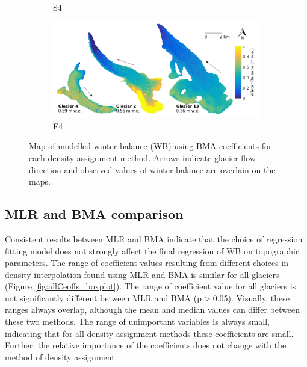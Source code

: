 \documentclass{sfuthesis}
\newcommand{\swedots}{Arrows indicate glacier flow direction and observed values of winter balance are overlain on the maps. }
\begin{document}
\begin{figure}[H]
\begin{subfigure}[b]{0.475\textwidth}
            \caption[]%
            {{\small S4}}    
        \end{subfigure}
        \quad
        \begin{subfigure}[b]{0.475\textwidth}   
            \centering 
            \includegraphics[width=\textwidth]{BMSmap_Modelled_Observed8.png}
            \caption[]%
            {{\small F4}}    
        \end{subfigure}
              
        \caption[Map of modelled winter balance (WB) using BMA coefficients for each density assignment method]
        {Map of modelled winter balance (WB) using BMA coefficients for each density assignment method. \swedots} 
        \label{fig:allBMSmodelled}
    \end{figure}




\subsection{MLR and BMA comparison}


Consistent results between MLR and BMA indicate that the choice of regression fitting model does not strongly affect the final regression of WB on topographic parameters. The range of coefficient values resulting from different choices in density interpolation found using MLR and BMA is similar for all glaciers (Figure \ref{fig:allCeoffs_boxplot}). The range of coefficient value for all glaciers is not significantly different between MLR and BMA (p$>$0.05). Visually, these ranges always overlap, although the mean and median values can differ between these two methods. The range of unimportant variables is always small, indicating that for all density assignment methods these coefficients are small. Further, the relative importance of the coefficients does not change with the method of density assignment. 
\end{document}
